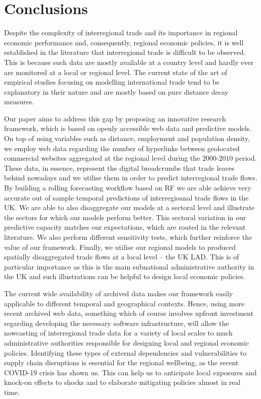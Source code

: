 \documentclass[]{interact}
\theoremstyle{plain}%
\theoremstyle{definition}
\theoremstyle{remark}
\begin{document}
\hypertarget{sec:6}{%
\section{Conclusions}\label{sec:6}}

Despite the complexity of interregional trade and its importance in
regional economic performance and, consequently, regional economic
policies, it is well established in the literature that interregional
trade is difficult to be observed. This is because such data are mostly
available at a country level and hardly ever are monitored at a local or
regional level. The current state of the art of empirical studies
focusing on modelling international trade tend to be explanatory in
their nature and are mostly based on pure distance decay measures.

Our paper aims to address this gap by proposing an innovative research
framework, which is based on openly accessible web data and predictive
models. On top of using variables such as distance, employment and
population density, we employ web data regarding the number of
hyperlinks between geolocated commercial websites aggregated at the
regional level during the \(2000\)-\(2010\) period. These data, in
essence, represent the digital breadcrumbs that trade leaves behind
nowadays and we utilise them in order to predict interregional trade
flows. By building a rolling forecasting workflow based on RF we are
able achieve very accurate out of sample temporal predictions of
interregioanal trade flows in the UK. We are able to also disaggregate
our models at a sectoral level and illustrate the sectors for which our
models perform better. This sectoral variation in our predictive
capacity matches our expectations, which are routed in the relevant
literature. We also perform different sensitivity tests, which further
reinforce the value of our framework. Finally, we utilise our regional
models to produced spatially disaggregated trade flows at a local level
-- the UK LAD. This is of particular importance as this is the main
subnational administrative authority in the UK and such illustrations
can be helpful to design local economic policies.

The current wide availability of archived data makes our framework
easily applicable to different temporal and geographical contexts.
Hence, using more recent archived web data, something which of course
involves upfront investment regarding developing the necessary software
infrastructure, will allow the nowcasting of interregional trade data
for a variety of local scales to much administrative authorities
responsible for designing local and regional economic policies.
Identifying these types of external dependencies and vulnerabilities to
supply chain disruptions is essential for the regional wellbeing, as the
recent COVID-19 crisis has shown us. This can help us to anticipate
local exposures and knock-on effects to shocks and to elaborate
mitigating policies almost in real time.



\end{document}
